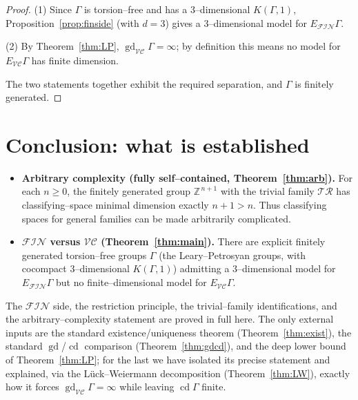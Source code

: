 \documentclass{amsart}
\theoremstyle{definition}
\newcommand{\Z}{\mathbb{Z}}
\newcommand{\FIN}{\mathcal{F\!I\!N}}
\newcommand{\VC}{\mathcal{V\!C}}
\newcommand{\gd}{\operatorname{gd}}
\newcommand{\cd}{\operatorname{cd}}
\begin{document}
\begin{proof}
(1) Since $\Gamma$ is torsion--free and has a $3$--dimensional $K(\Gamma,1)$,
Proposition~\ref{prop:finside} (with $d=3$) gives a $3$--dimensional model for
$E_{\FIN}\Gamma$.

(2) By Theorem~\ref{thm:LP}, $\gd_{\VC}\Gamma=\infty$; by definition this means no model for
$E_{\VC}\Gamma$ has finite dimension.

The two statements together exhibit the required separation, and $\Gamma$ is finitely
generated.
\end{proof}

\section{Conclusion: what is established}

\begin{itemize}
\item \textbf{Arbitrary complexity (fully self--contained, Theorem~\ref{thm:arb}).} For each
$n\ge 0$, the finitely generated group $\Z^{\,n+1}$ with the trivial family $\mathcal{TR}$ has
classifying--space minimal dimension exactly $n+1>n$. Thus classifying spaces for general
families can be made arbitrarily complicated.

\item \textbf{$\FIN$ versus $\VC$ (Theorem~\ref{thm:main}).} There are explicit finitely
generated torsion--free groups $\Gamma$ (the Leary--Petrosyan groups, with cocompact
$3$--dimensional $K(\Gamma,1)$) admitting a $3$--dimensional model for $E_{\FIN}\Gamma$ but no
finite--dimensional model for $E_{\VC}\Gamma$.
\end{itemize}

The $\FIN$ side, the restriction principle, the trivial--family identifications, and the
arbitrary--complexity statement are proved in full here. The only external inputs are the
standard existence/uniqueness theorem (Theorem~\ref{thm:exist}), the standard
$\gd$/$\cd$ comparison (Theorem~\ref{thm:gdcd}), and the deep lower bound of
Theorem~\ref{thm:LP}; for the last we have isolated its precise statement and explained, via
the Lück--Weiermann decomposition (Theorem~\ref{thm:LW}), exactly how it forces
$\gd_{\VC}\Gamma=\infty$ while leaving $\cd\Gamma$ finite.
\end{document}
